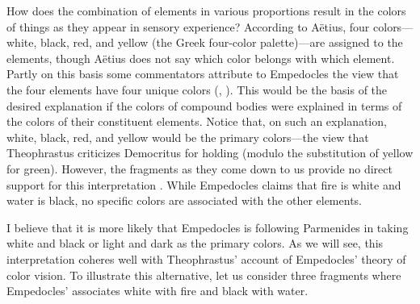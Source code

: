 How does the combination of elements in various proportions result in the colors of things as they appear in sensory experience? According to A\"{e}tius, four colors---white, black, red, and yellow (the Greek four-color palette)---are assigned to the elements, though A\"{e}tius does not say which color belongs with which element. Partly on this basis some commentators attribute to Empedocles the view that the four elements have four unique colors (\citealt[217]{Cherniss:1935fk}, \citealt[152-3]{Siegel:1959fk}). This would be the basis of the desired explanation if the colors of compound bodies were explained in terms of the colors of their constituent elements. Notice that, on such an explanation, white, black, red, and yellow would be the primary colors---the view that Theophrastus criticizes Democritus for holding (modulo the substitution of yellow for green).  However, the fragments as they come down to us provide no direct support for this interpretation \citep[see][]{Ierodiakonou:2005fk}. While Empedocles claims that fire is white and water is black, no specific colors are associated with the other elements. 

I believe that it is more likely that Empedocles is following Parmenides in taking white and black or light and dark as the primary colors. As we will see, this interpretation coheres well with Theophrastus' account of Empedocles' theory of color vision. To illustrate this alternative, let us consider three fragments where Empedocles' associates white with fire and black with water.

